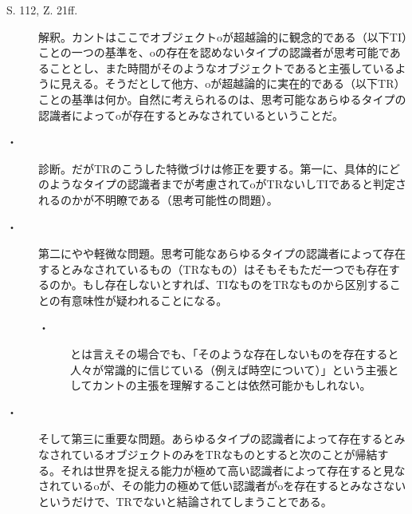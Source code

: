 \documentclass[a4j, 12pt,leqno]{jsarticle}
\begin{document}
\begin{description}
\item[S. 112, Z. 21ff.]解釈。カントはここでオブジェクトoが超越論的に観念的である（以下TI）ことの一つの基準を、oの存在を認めないタイプの認識者が思考可能であることとし、また時間がそのようなオブジェクトであると主張しているように見える。そうだとして他方、oが超越論的に実在的である（以下TR）ことの基準は何か。自然に考えられるのは、思考可能なあらゆるタイプの認識者によってoが存在するとみなされているということだ。
\item[・]診断。だがTRのこうした特徴づけは修正を要する。第一に、具体的にどのようなタイプの認識者までが考慮されてoがTRないしTIであると判定されるのかが不明瞭である（思考可能性の問題）。
\item[・]第二にやや軽微な問題。思考可能なあらゆるタイプの認識者によって存在するとみなされているもの（TRなもの）はそもそもただ一つでも存在するのか。もし存在しないとすれば、TIなものをTRなものから区別することの有意味性が疑われることになる。
\begin{description}
\item[・]とは言えその場合でも、「そのような存在しないものを存在すると人々が常識的に信じている（例えば時空について）」という主張としてカントの主張を理解することは依然可能かもしれない。
\end{description}
\item[・]そして第三に重要な問題。あらゆるタイプの認識者によって存在するとみなされているオブジェクトのみをTRなものとすると次のことが帰結する。それは世界を捉える能力が極めて高い認識者によって存在すると見なされているoが、その能力の極めて低い認識者がoを存在するとみなさないというだけで、TRでないと結論されてしまうことである。
\end{description}
\end{document}

